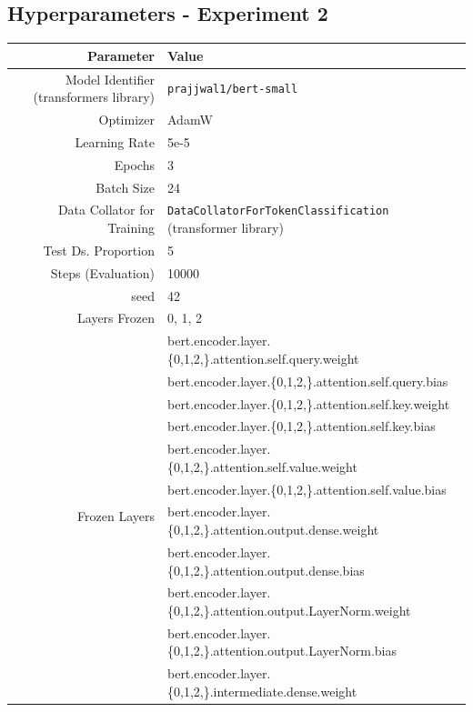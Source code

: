 \documentclass{article}
\begin{document}
\subsection{Hyperparameters - Experiment 2}
\begin{table}[!h]
    \centering
    \begin{tabular}{r|l}
        Parameter & Value \\ \hline
        Model Identifier (transformers library) & \texttt{prajjwal1/bert-small} \\
        Optimizer & AdamW \\
        Learning Rate & 5e-5 \\
        Epochs & 3 \\
        Batch Size & 24 \\
        Data Collator for Training & \texttt{DataCollatorForTokenClassification} (transformer library) \\
        Test Ds. Proportion & 5 \\
        Steps (Evaluation) & 10000 \\
        seed & 42 \\
        Layers Frozen & 0, 1, 2 \\
         \multirow{16}{*}{Frozen Layers} &     bert.encoder.layer.\{0,1,2,\}.attention.self.query.weight \\
                      &      bert.encoder.layer.\{0,1,2,\}.attention.self.query.bias \\
                      &      bert.encoder.layer.\{0,1,2,\}.attention.self.key.weight \\
                      &      bert.encoder.layer.\{0,1,2,\}.attention.self.key.bias \\
                      &      bert.encoder.layer.\{0,1,2,\}.attention.self.value.weight \\
                      &      bert.encoder.layer.\{0,1,2,\}.attention.self.value.bias \\
                      &      bert.encoder.layer.\{0,1,2,\}.attention.output.dense.weight \\
                      &      bert.encoder.layer.\{0,1,2,\}.attention.output.dense.bias \\
                      &      bert.encoder.layer.\{0,1,2,\}.attention.output.LayerNorm.weight \\
                      &      bert.encoder.layer.\{0,1,2,\}.attention.output.LayerNorm.bias \\
                      &      bert.encoder.layer.\{0,1,2,\}.intermediate.dense.weight \\

\end{tabular}
\end{table}
\end{document}
